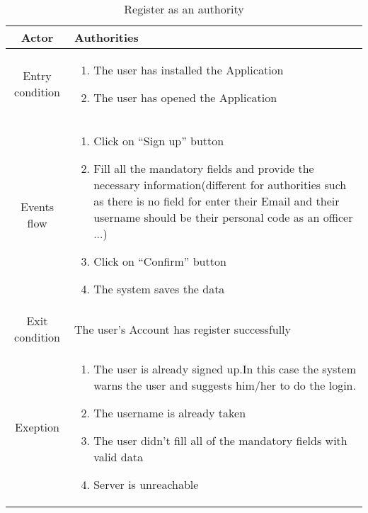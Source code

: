 \documentclass{article}
\begin{document}
		\begin{table} [H]
		\begin{center}
		\caption{Register as an authority}
		\begin{tabular}{|c|p{8cm}|}
			\hline
			Actor&Authorities\\
			\hline
			Entry condition&\begin{enumerate}
								\item The user has installed the Application
								\item The user has opened the Application
							\end{enumerate}\\
			\hline
			Events flow & \begin{enumerate}
							\item Click on “Sign up” button
							\item Fill all the mandatory fields and provide the necessary information(different for authorities such as there is no field for enter their Email and their username should be their personal code as an officer ...)
							\item Click on “Confirm” button
							\item The system saves the data
						\end{enumerate}\\
			\hline
			Exit condition& The user's Account has register successfully\\
			\hline
			Exeption& \begin{enumerate}
							\item The user is already signed up.In this case the system warns the user and suggests him/her to do the login.
							\item The username is already taken
							\item The user didn’t fill all of the mandatory fields with valid data
							\item Server is unreachable
						\end{enumerate}\\
			\hline
		\end{tabular}
		\end{center}
		\end{table} 
	
\end{document}
